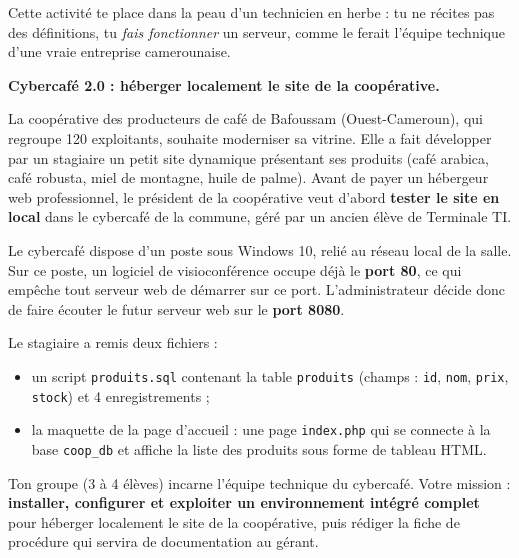 \documentclass[11pt]{article}
\newcounter{popsec}
\newcounter{popsub}
\newcommand{\courssub}[1]{%
  \stepcounter{popsub}%
  \par\vspace{9pt}\noindent{\popxbold\fontsize{11.5}{13}\selectfont\color{popink}{\color{poporange}\thepopsec.\thepopsub}\hspace{6pt}#1}\par\nopagebreak\vspace{4pt}
}
\begin{document}
Cette activité te place dans la peau d'un technicien en herbe : tu ne récites pas des définitions, tu \emph{fais fonctionner} un serveur, comme le ferait l'équipe technique d'une vraie entreprise camerounaise.

\courssub{Situation}

\textbf{Cybercafé 2.0 : héberger localement le site de la coopérative.}

La coopérative des producteurs de café de Bafoussam (Ouest-Cameroun), qui regroupe 120 exploitants, souhaite moderniser sa vitrine. Elle a fait développer par un stagiaire un petit site dynamique présentant ses produits (café arabica, café robusta, miel de montagne, huile de palme). Avant de payer un hébergeur web professionnel, le président de la coopérative veut d'abord \textbf{tester le site en local} dans le cybercafé de la commune, géré par un ancien élève de Terminale TI.

Le cybercafé dispose d'un poste sous Windows 10, relié au réseau local de la salle. Sur ce poste, un logiciel de visioconférence occupe déjà le \textbf{port 80}, ce qui empêche tout serveur web de démarrer sur ce port. L'administrateur décide donc de faire écouter le futur serveur web sur le \textbf{port 8080}.

Le stagiaire a remis deux fichiers :
\begin{itemize}
\item un script \texttt{produits.sql} contenant la table \texttt{produits} (champs : \texttt{id}, \texttt{nom}, \texttt{prix}, \texttt{stock}) et 4 enregistrements ;
\item la maquette de la page d'accueil : une page \texttt{index.php} qui se connecte à la base \texttt{coop\_db} et affiche la liste des produits sous forme de tableau HTML.
\end{itemize}

Ton groupe (3 à 4 élèves) incarne l'équipe technique du cybercafé. Votre mission : \textbf{installer, configurer et exploiter un environnement intégré complet} pour héberger localement le site de la coopérative, puis rédiger la fiche de procédure qui servira de documentation au gérant.

\courssub{Consignes}
\end{document}
